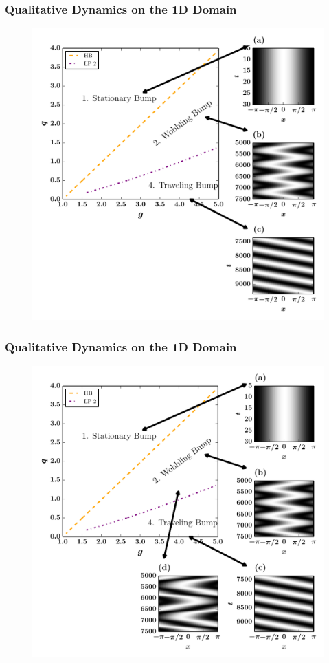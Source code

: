 \documentclass{beamer}
\begin{document}
\begin{frame}
\frametitle{Qualitative Dynamics on the 1D Domain}
\begin{figure}
 \includegraphics[width=.7\textwidth]{oned_full_2par3.pdf}
\end{figure}
\end{frame}


\begin{frame}
\frametitle{Qualitative Dynamics on the 1D Domain}
\begin{figure}
 \includegraphics[width=.7\textwidth]{oned_full_2par4.pdf}
\end{figure}
\end{frame}
\end{document}
